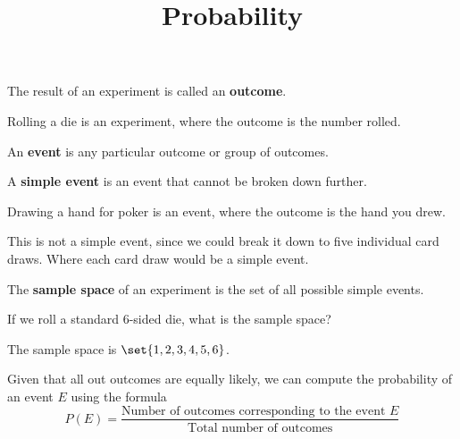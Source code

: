 \documentclass{beamer}
\title[MATH 1030 - Module 9 - Probability]{Probability}
\newcommand{\prob}[1]{P\left(#1\right)}
\begin{document}
\begin{frame}
\titlepage
\end{frame}

\begin{frame}
\begin{definition}
The result of an experiment is called an \textbf{outcome}.
\end{definition}\pause

\begin{example}
Rolling a die is an experiment, where the outcome is the number rolled.
\end{example}\pause

\begin{definition}
An \textbf{event} is any particular outcome or group of outcomes.

\vspace{2mm}
A \textbf{simple event} is an event that cannot be broken down further.
\end{definition}\pause

\begin{example}
Drawing a hand for poker is an event, where the outcome is the hand you drew.

\vspace{2mm}
This is not a simple event, since we could break it down to five individual card draws. Where each card draw would be a simple event.
\end{example}
\end{frame}

\begin{frame}
\begin{definition}
The \textbf{sample space} of an experiment is the set of all possible simple events.
\end{definition}\pause

\begin{example}
If we roll a standard 6-sided die, what is the sample space?\pause

\vspace{2mm}
The sample space is $\set{1,2,3,4,5,6}$.
\end{example}\pause

\begin{definition}
Given that all out outcomes are equally likely, we can compute the probability of an event $E$ using the formula
\begin{equation*}
\prob{E}=\dfrac{\text{Number of outcomes corresponding to the event $E$}}{\text{Total number of outcomes}}
\end{equation*}
\end{definition}
\end{frame}
\end{document}
